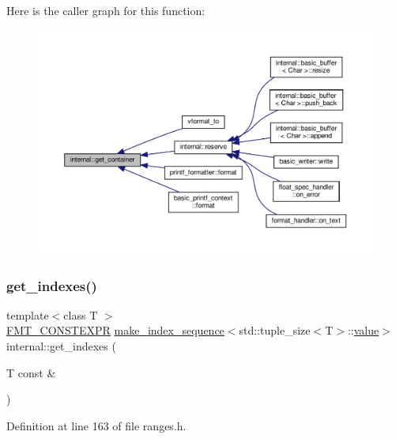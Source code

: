Here is the caller graph for this function\+:
\nopagebreak
\begin{figure}[H]
\begin{center}
\leavevmode
\includegraphics[width=350pt]{namespaceinternal_a8cf1f0f18fd01743349131744dc7c1c3_icgraph}
\end{center}
\end{figure}
\mbox{\label{namespaceinternal_aa8f32827bf5cced22ea13872d6058762}} 
\subsubsection{\texorpdfstring{get\+\_\+indexes()}{get\_indexes()}}
{\footnotesize\ttfamily template$<$class T $>$ \\
\hyperlink{core_8h_a69201cb276383873487bf68b4ef8b4cd}{F\+M\+T\+\_\+\+C\+O\+N\+S\+T\+E\+X\+PR} \hyperlink{namespaceinternal_ac3a4f2187fce6a6dfd5576bd311c9876}{make\+\_\+index\+\_\+sequence}$<$std\+::tuple\+\_\+size$<$T$>$\+::\hyperlink{classinternal_1_1value}{value}$>$ internal\+::get\+\_\+indexes (\begin{DoxyParamCaption}\item[{T const \&}]{ }\end{DoxyParamCaption})}



Definition at line 163 of file ranges.\+h.

